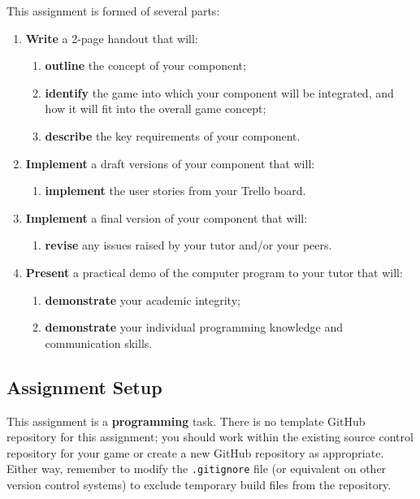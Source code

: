 This assignment is formed of several parts:
\begin{enumerate}[label=(\Alph*)]
	\item \textbf{Write} a 2-page handout that will:
		\begin{enumerate}[label=(\roman*)]
			\item \textbf{outline} the concept of your component;
			\item \textbf{identify} the game into which your component will be integrated, and how it will fit into
				the overall game concept;
			\item \textbf{describe} the key requirements of your component.
		\end{enumerate}
	\item \textbf{Implement} a draft versions of your component that will:
		\begin{enumerate}[label=(\roman*)]
			\item \textbf{implement} the user stories from your Trello board.
		\end{enumerate}
	\item \textbf{Implement} a final version of your component that will:
		\begin{enumerate}[label=(\roman*)]
			\item \textbf{revise} any issues raised by your tutor and/or your peers.
		\end{enumerate}
	\item \textbf{Present} a practical demo of the computer program to your tutor that will:
		\begin{enumerate}[label=(\roman*)]
			\item \textbf{demonstrate} your academic integrity;
			\item \textbf{demonstrate} your individual programming knowledge and communication skills.
		\end{enumerate}
\end{enumerate}

\subsection*{Assignment Setup}

This assignment is a \textbf{programming} task.
There is no template GitHub repository for this assignment;
you should work within the existing source control repository for your game
or create a new GitHub repository as appropriate.
Either way, remember to modify the \texttt{.gitignore} file (or equivalent on other version control systems) to exclude temporary build files
from the repository.

